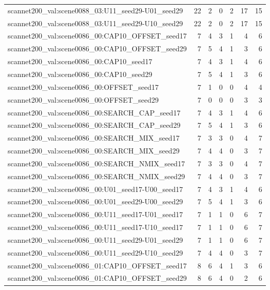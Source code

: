 \begin{table}[t]
\begin{tabular}{lrrrrrr}
scannet200\_val:scene0088\_03:U11\_seed29-U01\_seed29 & 22 & 2 & 0 & 2 & 17 & 15 \\
scannet200\_val:scene0088\_03:U11\_seed29-U10\_seed29 & 22 & 2 & 0 & 2 & 17 & 15 \\
scannet200\_val:scene0086\_00:CAP10\_OFFSET\_seed17 & 7 & 4 & 3 & 1 & 4 & 6 \\
scannet200\_val:scene0086\_00:CAP10\_OFFSET\_seed29 & 7 & 5 & 4 & 1 & 3 & 6 \\
scannet200\_val:scene0086\_00:CAP10\_seed17 & 7 & 4 & 3 & 1 & 4 & 6 \\
scannet200\_val:scene0086\_00:CAP10\_seed29 & 7 & 5 & 4 & 1 & 3 & 6 \\
scannet200\_val:scene0086\_00:OFFSET\_seed17 & 7 & 1 & 0 & 0 & 4 & 4 \\
scannet200\_val:scene0086\_00:OFFSET\_seed29 & 7 & 0 & 0 & 0 & 3 & 3 \\
scannet200\_val:scene0086\_00:SEARCH\_CAP\_seed17 & 7 & 4 & 3 & 1 & 4 & 6 \\
scannet200\_val:scene0086\_00:SEARCH\_CAP\_seed29 & 7 & 5 & 4 & 1 & 3 & 6 \\
scannet200\_val:scene0086\_00:SEARCH\_MIX\_seed17 & 7 & 3 & 3 & 0 & 4 & 7 \\
scannet200\_val:scene0086\_00:SEARCH\_MIX\_seed29 & 7 & 4 & 4 & 0 & 3 & 7 \\
scannet200\_val:scene0086\_00:SEARCH\_NMIX\_seed17 & 7 & 3 & 3 & 0 & 4 & 7 \\
scannet200\_val:scene0086\_00:SEARCH\_NMIX\_seed29 & 7 & 4 & 4 & 0 & 3 & 7 \\
scannet200\_val:scene0086\_00:U01\_seed17-U00\_seed17 & 7 & 4 & 3 & 1 & 4 & 6 \\
scannet200\_val:scene0086\_00:U01\_seed29-U00\_seed29 & 7 & 5 & 4 & 1 & 3 & 6 \\
scannet200\_val:scene0086\_00:U11\_seed17-U01\_seed17 & 7 & 1 & 1 & 0 & 6 & 7 \\
scannet200\_val:scene0086\_00:U11\_seed17-U10\_seed17 & 7 & 1 & 1 & 0 & 6 & 7 \\
scannet200\_val:scene0086\_00:U11\_seed29-U01\_seed29 & 7 & 1 & 1 & 0 & 6 & 7 \\
scannet200\_val:scene0086\_00:U11\_seed29-U10\_seed29 & 7 & 4 & 4 & 0 & 3 & 7 \\
scannet200\_val:scene0086\_01:CAP10\_OFFSET\_seed17 & 8 & 6 & 4 & 1 & 3 & 6 \\
scannet200\_val:scene0086\_01:CAP10\_OFFSET\_seed29 & 8 & 6 & 4 & 0 & 2 & 6 \\

\end{tabular}
\end{table}
